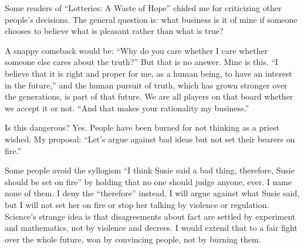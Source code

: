
Some readers of ``Lotteries: A Waste of Hope'' chided me for criticizing other people's decisions. The general question is: what business is it of mine if someone chooses to believe what is pleasant rather than what is true? 

A snappy comeback would be: ``Why do you care whether I care whether someone else cares about the truth?'' But that is no answer. Mine is this. ``I believe that it is right and proper for me, as a human being, to have an interest in the future,'' and the human pursuit of truth, which has grown stronger over the generations, is part of that future. We are all players on that board whether we accept it or not. ``And that makes your rationality my business.'' 

Is this dangerous? Yes. People have been burned for not thinking as a priest wished. My proposal: ``Let's argue against bad ideas but not set their bearers on fire.'' 

Some people avoid the syllogism ``I think Susie said a bad thing, therefore, Susie should be set on fire'' by holding that no one should judge anyone, ever. I name none of them.  I deny the ``therefore'' instead. I will argue against what Susie said, but I will not set her on fire or stop her talking by violence or regulation. Science's strange idea is that disagreements about fact are settled by experiment and mathematics, not by violence and decrees. I would extend that to a fair fight over the whole future, won by convincing people, not by burning them.

